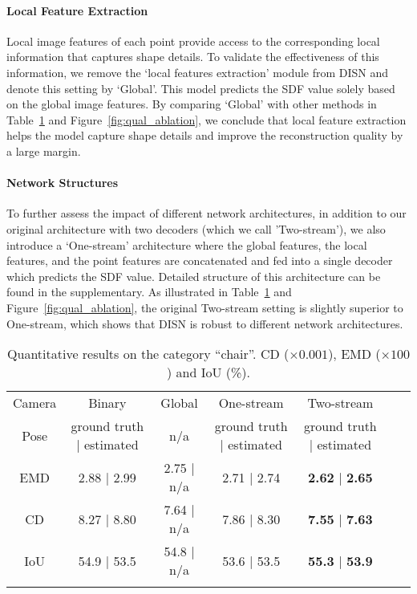\paragraph{Local Feature Extraction}
Local image features of each point provide access to the corresponding local information that captures shape details. To validate the effectiveness of this information, we remove the `local features extraction' module from DISN and denote this setting by `Global'. This model predicts the SDF value solely based on the global image features. By comparing `Global' with other methods in Table~\ref{tab:quant_ablation} and Figure~\ref{fig:qual_ablation}, we conclude that local feature extraction helps the model capture shape details and improve the reconstruction quality by a large margin. 
\vspace{-5pt}

\paragraph{Network Structures}
To further assess the impact of different network architectures, in addition to our original architecture with two decoders (which we call 'Two-stream'), we also introduce a `One-stream' architecture where the global features, the local features, and the point features are concatenated and fed into a single decoder which predicts the SDF value. Detailed structure of this architecture can be found in the supplementary. As illustrated in Table~\ref{tab:quant_ablation} and Figure~\ref{fig:qual_ablation}, the original Two-stream setting is slightly superior to One-stream, which shows that DISN is robust to different network architectures.



\begin{table}[!hbt]
\begin{adjustwidth}{-8pt}{0pt}
\setlength\tabcolsep{6pt} \begin{tabular}{c|cccccc}
\Xhline{2\arrayrulewidth}
Camera &  Binary & Global & One-stream  & Two-stream \\
 Pose &   ground truth | estimated &  n/a   &     ground truth | estimated  &             ground truth | estimated \\\hline
EMD &   2.88 | 2.99 &   2.75 | n/a &   2.71 | 2.74 &  \textbf{2.62} | \textbf{2.65}  \\ \hline
CD  &   8.27 | 8.80 &   7.64 | n/a &   7.86 | 8.30 &  \textbf{7.55} | \textbf{7.63}    \\ \hline
IoU &   54.9 | 53.5 &   54.8 | n/a &   53.6 | 53.5 &  \textbf{55.3} | \textbf{53.9}    \\ 
\Xhline{2\arrayrulewidth}
\end{tabular}
\vspace{3pt}
\caption {Quantitative results on the category ``chair''. CD ($\times 0.001$), EMD ($\times 100$) and IoU (\%).
}
\label{tab:quant_ablation}
\vspace{-20pt}
\end{adjustwidth}
\end{table}

